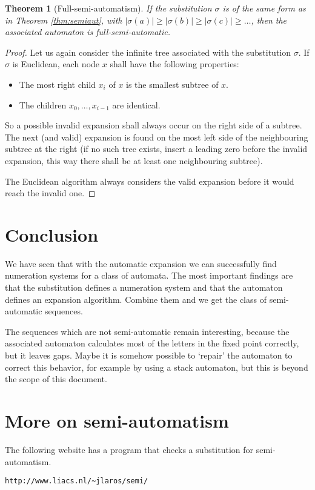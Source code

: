 \documentclass{article}
\newtheorem{theorem}{Theorem}[subsection]
\theoremstyle{definition}
\begin{document}
\begin{theorem}[Full-semi-automatism] \label{thm:fsa}
If the substitution $\sigma$ is of the same form as in Theorem 
\ref{thm:semiaut}, with 
$|\sigma(a)| \ge |\sigma(b)| \ge |\sigma(c)| \ge \ldots$, then the 
associated automaton is full-semi-automatic.
\end{theorem}
\begin{proof}
Let us again consider the infinite tree associated with the substitution
$\sigma$. If $\sigma$ is Euclidean, each node $x$ shall have the following 
properties:
\begin{itemize}
\item The most right child $x_i$ of $x$ is the smallest subtree of $x$.
\item The children $x_0, \ldots, x_{i - 1}$ are identical.
\end{itemize}
So a possible invalid expansion shall always occur on the right side of 
a subtree. The next (and valid) expansion is found on the most left side of 
the neighbouring subtree at the right (if no such tree exists, insert a 
leading zero before the invalid expansion, this way there shall be at least 
one neighbouring subtree).

The Euclidean algorithm always considers the valid expansion before it would
reach the invalid one.
\end{proof}

\section{Conclusion}
We have seen that with the automatic expansion we can successfully find 
numeration systems for a class of automata. The most important findings are
that the substitution defines a numeration system and that the automaton 
defines an expansion algorithm. Combine them and we get the class of 
semi-automatic sequences.

The sequences which are not semi-automatic remain interesting, because the 
associated automaton calculates most of the letters in the fixed point 
correctly, but it leaves gaps.  Maybe it is somehow possible to `repair' the 
automaton to correct this behavior, for example by using a stack automaton, 
but this is beyond the scope of this document.

\section{More on semi-automatism}
The following website has a program that checks a substitution for 
semi-automatism.
\begin{verbatim}
http://www.liacs.nl/~jlaros/semi/
\end{verbatim}
\end{document}
